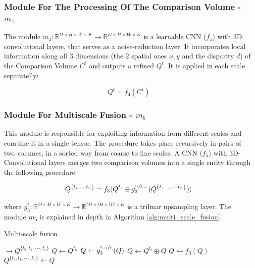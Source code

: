 \documentclass[runningheads]{llncs}
\begin{document}
\subsubsection{Module For The Processing Of The Comparison Volume - $m_4$} The module $m_4: \mathbb{R}^{D \times H \times W \times K} \rightarrow \mathbb{R}^{D \times H \times W \times K}$ is a learnable CNN ($f_4$) with 3D convolutional layers, that serves as a noise-reduction layer. It incorporates local information along all 3 dimensions (the 2 spatial ones $x,y$ and the disparity $d$) of the Comparison Volume $C^t$ and outputs a refined $Q^t$. It is applied in each scale separatelly:

\begin{equation}
    Q^t = f_4(C^t)
\end{equation}


\subsubsection{Module For Multiscale Fusion - $m_5$}

This module is responsible for exploiting information from different scales and combine it in a single tensor. The procedure takes place recursively in pairs of two volumes, in a sorted way from coarse to fine scales. A CNN ($f_5$) with 3D-Convolutional layers merges two comparison volumes into a single entity through the following procedure:

\begin{equation} \label{eq:two_scale_fusion}
Q^{ \{ t_i, \cdot \cdot \cdot, t_{n} \} } = f_3(Q^{t_i} \oplus g_3^{\sfrac{t_i}{t_{i-1}} }(Q^{ \{ t_{i-1}, \cdot \cdot \cdot, t_n \} }))
\end{equation}

where $g_3^t: \mathbb{R}^{D \times H \times W \times K} \rightarrow \mathbb{R}^{tD \times tH \times tW \times K}$ is a trilinar upsampling layer. The module $m_5$ is explained in depth in Algorithm \ref{alg:multi_scale_fusion}.


\begin{algorithm}
\caption{Multi-scale fusion}\label{alg:multi_scale_fusion}
\begin{algorithmic}[1]
 $\rightarrow Q^{\{t_0, t_1, \cdot \cdot \cdot, t_n\}}$ 
\State $Q \gets Q^{t_n}$ 
\State $Q \gets g_3^{\sfrac{ t_{i+1} }{ t_i } }(Q)$ 
\State $Q \gets Q^{t_i} \oplus Q$ 
\State $Q \gets f_3(Q)$ 
\EndFor
\State \Return $Q^{\{t_0, t_1, \cdot \cdot \cdot, t_n\}} \gets Q$ 
\EndProcedure
\end{algorithmic}
\end{algorithm}
\end{document}
